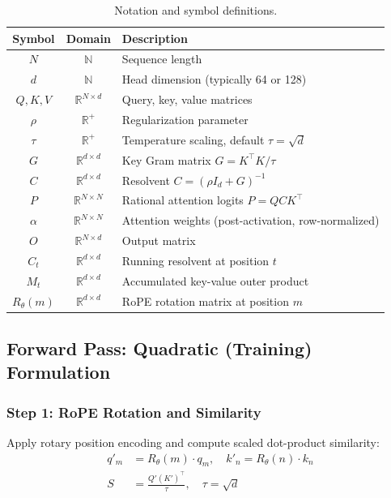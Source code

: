 \documentclass[11pt,a4paper]{article}
\theoremstyle{remark}
\begin{document}
\begin{table}[h]
\centering
\caption{Notation and symbol definitions.}
\begin{tabular}{ccl}
\toprule
\textbf{Symbol} & \textbf{Domain} & \textbf{Description} \\
\midrule
$N$ & $\mathbb{N}$ & Sequence length \\
$d$ & $\mathbb{N}$ & Head dimension (typically 64 or 128) \\
$Q, K, V$ & $\mathbb{R}^{N \times d}$ & Query, key, value matrices \\
$\rho$ & $\mathbb{R}^+$ & Regularization parameter \\
$\tau$ & $\mathbb{R}^+$ & Temperature scaling, default $\tau = \sqrt{d}$ \\
$G$ & $\mathbb{R}^{d \times d}$ & Key Gram matrix $G = K^\top K / \tau$ \\
$C$ & $\mathbb{R}^{d \times d}$ & Resolvent $C = (\rho I_d + G)^{-1}$ \\
$P$ & $\mathbb{R}^{N \times N}$ & Rational attention logits $P = Q C K^\top$ \\
$\alpha$ & $\mathbb{R}^{N \times N}$ & Attention weights (post-activation, row-normalized) \\
$O$ & $\mathbb{R}^{N \times d}$ & Output matrix \\
$C_t$ & $\mathbb{R}^{d \times d}$ & Running resolvent at position $t$ \\
$M_t$ & $\mathbb{R}^{d \times d}$ & Accumulated key-value outer product \\
$R_\theta(m)$ & $\mathbb{R}^{d \times d}$ & RoPE rotation matrix at position $m$ \\
\bottomrule
\end{tabular}
\end{table}

\subsection{Forward Pass: Quadratic (Training) Formulation}

\subsubsection{Step 1: RoPE Rotation and Similarity}
Apply rotary position encoding and compute scaled dot-product similarity:
\begin{align}
q'_m &= R_\theta(m) \cdot q_m, \quad k'_n = R_\theta(n) \cdot k_n \\
S &= \frac{Q' (K')^\top}{\tau}, \quad \tau = \sqrt{d}
\end{align}
\end{document}
